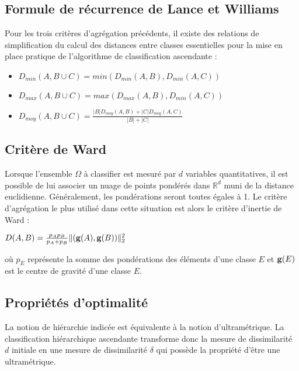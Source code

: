 \documentclass[letterpaper,10pt,english]{jupyterBook}
\begin{document}
\sphinxAtStartPar
{}


\subsection{Formule de récurrence de Lance et Williams}
\label{\detokenize{clustering:formule-de-recurrence-de-lance-et-williams}}
\sphinxAtStartPar
Pour les trois critères d’agrégation précédents, il existe des relations de simplification du calcul des distances entre classes essentielles pour la mise en place pratique de l’algorithme de classification ascendante :
\begin{itemize}
\item {} 
\sphinxAtStartPar
\(D_{min}(A,B\cup C)=min(D_{min}(A,B),D_{min}(A,C))\)

\item {} 
\sphinxAtStartPar
\(D_{max}(A,B\cup C)=max(D_{max}(A,B),D_{min}(A,C))\)

\item {} 
\sphinxAtStartPar
\(D_{moy}(A,B\cup C)=\frac{|B|D_{moy}(A,B)+|C|D_{moy}(A,C)}{|B|+|C|}\)

\end{itemize}


\subsection{Critère de Ward}
\label{\detokenize{clustering:critere-de-ward}}
\ignorespaces 
\sphinxAtStartPar
Lorsque l’ensemble  \(\Omega\) à classifier est mesuré par \(d\) variables quantitatives, il est possible de lui associer un nuage de points pondérés dans \(\mathbb{R}^d\) muni de la distance euclidienne. Généralement, les pondérations seront toutes égales à 1. Le critère d’agrégation le plus utilisé dans cette situation est alors le critère d’inertie de Ward :

\sphinxAtStartPar
\(D(A,B)=\frac{p_Ap_B}{p_A+p_B}\|({\bf g}(A),{\bf g}(B))\|_2^2\)

\sphinxAtStartPar
où \(p_E\) représente la somme des pondérations des éléments d’une classe \(E\) et \({\bf g}(E)\) est le centre de gravité d’une classe \(E\).


\subsection{Propriétés d’optimalité}
\label{\detokenize{clustering:proprietes-d-optimalite}}
\sphinxAtStartPar
La notion de hiérarchie indicée est équivalente à la notion d’ultramétrique. La classification hiérarchique ascendante transforme donc la mesure de dissimilarité \(d\) initiale en une mesure de dissimilarité \(\delta\) qui possède la propriété d’être une ultramétrique.
\end{document}
